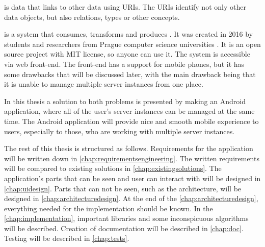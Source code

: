\ld{} is data that links to other data using URIs.
The URIs identify not only other data objects, but also relations, types or other concepts. \cite{linkeddata}

\etl{} is a system that consumes, transforms and produces \ld{}.
It was created in 2016 by students and researchers from Prague computer science universities \cite{etlpublication}.
It is an open source project \cite{etl} with MIT license, so anyone can use it.
The system is accessible via web front-end.
The front-end has a support for mobile phones, but it has some drawbacks that will be discussed later, with the main drawback being that it is unable to manage multiple server instances from one place.

In this thesis a solution to both problems is presented by making an Android application, where all of the user's \etl{} server instances can be managed at the same time.
The Android application will provide nice and smooth mobile experience to \etl{} users, especially to those, who are working with multiple server instances.

The rest of this thesis is structured as follows.
Requirements for the application will be written down in \autoref{chap:requirementsengineering}.
The written requirements will be compared to existing solutions in \autoref{chap:existingsolutions}.
The application's parts that can be seen and user can interact with will be designed in \autoref{chap:uidesign}.
Parts that can not be seen, such as the architecture, will be designed in \autoref{chap:architecturedesign}.
At the end of the \autoref{chap:architecturedesign}, everything needed for the implementation should be known.
In the \autoref{chap:implementation}, important libraries and some inconspicuous algorithms will be described.
Creation of documentation will be described in \autoref{chap:doc}.
Testing will be described in \autoref{chap:tests}.
